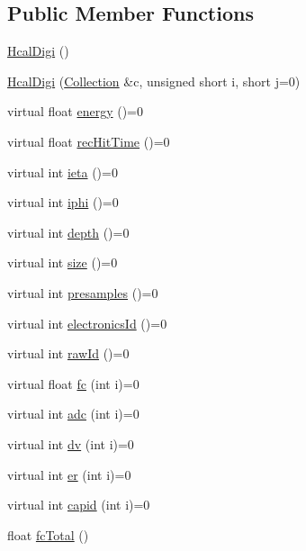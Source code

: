 \subsection*{Public Member Functions}
\begin{DoxyCompactItemize}
\item 
\hyperlink{class_hcal_digi_a0577e9f390ff911e083f7465cb0e8f1d}{Hcal\+Digi} ()
\item 
\hyperlink{class_hcal_digi_a5f4c54b1683c340b0256aa35efb951ca}{Hcal\+Digi} (\hyperlink{class_collection}{Collection} \&c, unsigned short i, short j=0)
\item 
virtual float \hyperlink{class_hcal_digi_a665c0fa940132fafc6dce9fd75f18cea}{energy} ()=0
\item 
virtual float \hyperlink{class_hcal_digi_a3936cda623fc7535ed35d8d1c6abb350}{rec\+Hit\+Time} ()=0
\item 
virtual int \hyperlink{class_hcal_digi_a65fc605c5c3bca7f78d961400d145c94}{ieta} ()=0
\item 
virtual int \hyperlink{class_hcal_digi_a979dec4585c9d07a7dc4060dfb97f089}{iphi} ()=0
\item 
virtual int \hyperlink{class_hcal_digi_a916a582b044a64e041ba38e545349f7f}{depth} ()=0
\item 
virtual int \hyperlink{class_hcal_digi_a054f6f17539c8042d2900144d06eb4fc}{size} ()=0
\item 
virtual int \hyperlink{class_hcal_digi_aad0fc232379d8bdd40d6be32b3c980c4}{presamples} ()=0
\item 
virtual int \hyperlink{class_hcal_digi_afc95a09767a731b098cb2e22b89cc4e0}{electronics\+Id} ()=0
\item 
virtual int \hyperlink{class_hcal_digi_aba55732d16499ad510091c769807f8e1}{raw\+Id} ()=0
\item 
virtual float \hyperlink{class_hcal_digi_a4a5e45ca390ee81fe384bf4a7d05f1e0}{fc} (int i)=0
\item 
virtual int \hyperlink{class_hcal_digi_a737b46ab9bc5439f32232ee6911ed516}{adc} (int i)=0
\item 
virtual int \hyperlink{class_hcal_digi_aa758519b70ab24ac4bb7635052cfa174}{dv} (int i)=0
\item 
virtual int \hyperlink{class_hcal_digi_a04b02a86692bcdff2fb8fa8c50cc0c34}{er} (int i)=0
\item 
virtual int \hyperlink{class_hcal_digi_ad6e205312dda117af660b9391d502155}{capid} (int i)=0
\item 
float \hyperlink{class_hcal_digi_a138d4ee8f433530dd2ed391cf036f233}{fc\+Total} ()

\end{DoxyCompactItemize}
